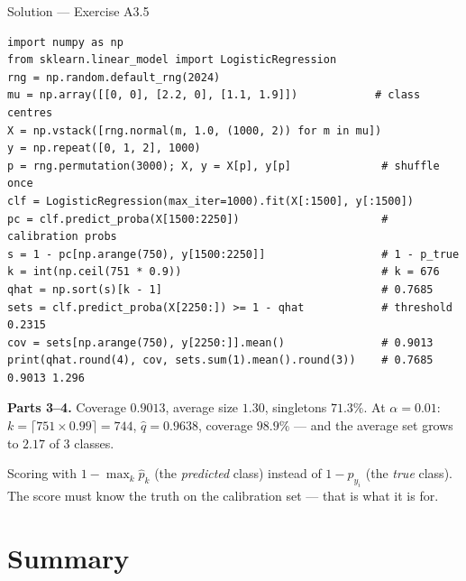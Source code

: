 \documentclass[aspectratio=169,11pt]{beamer}
\begin{document}
\begin{frame}[fragile]{Solution --- Exercise A3.5}
\begin{solutionbox}
\begin{lstlisting}[basicstyle=\ttfamily\scriptsize]
import numpy as np
from sklearn.linear_model import LogisticRegression
rng = np.random.default_rng(2024)
mu = np.array([[0, 0], [2.2, 0], [1.1, 1.9]])            # class centres
X = np.vstack([rng.normal(m, 1.0, (1000, 2)) for m in mu])
y = np.repeat([0, 1, 2], 1000)
p = rng.permutation(3000); X, y = X[p], y[p]              # shuffle once
clf = LogisticRegression(max_iter=1000).fit(X[:1500], y[:1500])
pc = clf.predict_proba(X[1500:2250])                      # calibration probs
s = 1 - pc[np.arange(750), y[1500:2250]]                  # 1 - p_true
k = int(np.ceil(751 * 0.9))                               # k = 676
qhat = np.sort(s)[k - 1]                                  # 0.7685
sets = clf.predict_proba(X[2250:]) >= 1 - qhat            # threshold 0.2315
cov = sets[np.arange(750), y[2250:]].mean()               # 0.9013
print(qhat.round(4), cov, sets.sum(1).mean().round(3))    # 0.7685 0.9013 1.296
\end{lstlisting}
  \textbf{Parts 3--4.} Coverage $0.9013$, average size $1.30$, singletons $71.3\%$.
  At $\alpha = 0.01$: $k = \lceil 751 \times 0.99 \rceil = 744$, $\hat q = 0.9638$,
  coverage $98.9\%$ --- and the average set grows to $2.17$ of 3 classes.
\end{solutionbox}
\begin{mistake}
  Scoring with $1 - \max_k \hat p_k$ (the \emph{predicted} class) instead of
  $1 - \hat p_{y_i}$ (the \emph{true} class). The score must know the truth on the
  calibration set --- that is what it is for.
\end{mistake}
\end{frame}

\section{Summary}
\end{document}
